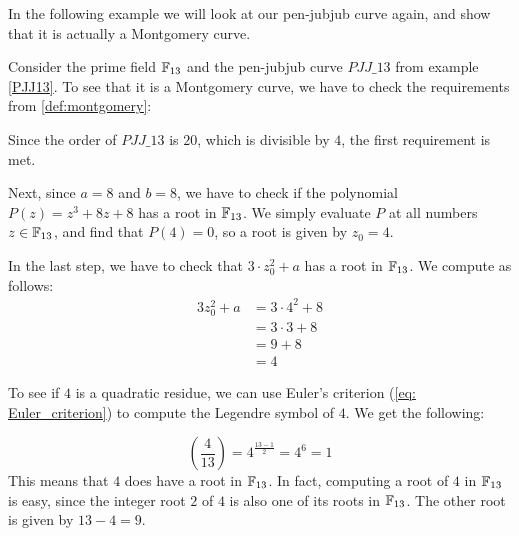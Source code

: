 In the following example we will look at our pen-jubjub curve again, and show that it is actually a Montgomery curve.
\begin{example}\label{PJJ13-montgomery}
Consider the prime field $\mathbb{F}_{13}$ and the pen-jubjub curve $\mathit{PJJ\_13}$ from example \ref{PJJ13}. To see that it is a Montgomery curve, we have to check the requirements from \ref{def:montgomery}: 

Since the order  of $\mathit{PJJ\_13}$ is $20$, which is divisible by $4$, the first requirement is met. 

Next, since $a=8$ and $b=8$, we have to check if the polynomial $P(z) = z^3 + 8z + 8$ has a root in $\mathbb{F}_{13}$. We simply evaluate $P$ at all numbers $z\in \mathbb{F}_{13}$, and find that $P(4)=0$, so a root is given by $z_0=4$.

In the last step, we have to check that $3\cdot z_0^2 + a$ has a root in $\mathbb{F}_{13}$. We compute as follows:
\begin{align*}
3z_0^2 + a & = 3\cdot 4^2 + 8 \\
           & = 3 \cdot 3 + 8 \\
           & = 9 + 8 \\
           & = 4
\end{align*}

To see if $4$ is a quadratic residue, we can use Euler's criterion (\ref{eq: Euler_criterion}) to compute the Legendre symbol of $4$. We get the following:

$$
\left(\frac{4}{13}\right) = 4^{\frac{13-1}{2}} = 4^6 = 1
$$ 
This means that $4$ does have a root in $\mathbb{F}_{13}$. In fact, computing a root of $4$ in $\mathbb{F}_{13}$ is easy, since the integer root $2$ of $4$ is also one of its roots in $\mathbb{F}_{13}$. The other root is given by $13-4=9$.


\end{example}
